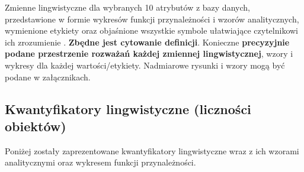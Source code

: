 \documentclass{article}
\begin{document}
Zmienne lingwistyczne dla wybranych 10 atrybutów z bazy danych, przedstawione w
formie wykresów funkcji przynależności i wzorów analitycznych, wymienione etykiety oraz objaśnione wszystkie
symbole ułatwiające czytelnikowi ich zrozumienie \cite{zadrozny06}. {\bf Zbędne jest
cytowanie definicji}. Konieczne {\bf precyzyjnie podane przestrzenie rozważań każdej
zmiennej lingwistycznej}, wzory i wykresy dla każdej wartości/etykiety.
Nadmiarowe rysunki i wzory mogą być podane w załącznikach. 

\subsection{Kwantyfikatory lingwistyczne (liczności obiektów)}
Poniżej zostały zaprezentowane kwantyfikatory lingwistyczne wraz z ich wzorami analitycznymi oraz wykresem funkcji przynależności.
\end{document}
